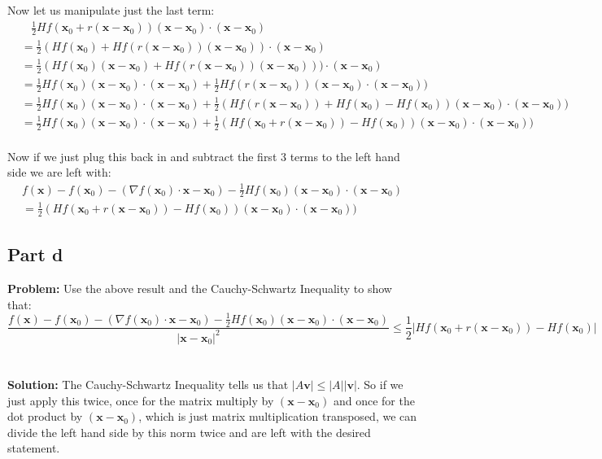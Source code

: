 \documentclass{article}
\begin{document}
Now let us manipulate just the last term:
\begin{align*}
&\ \ \ \ \frac{1}{2}Hf(\mathbf x_0+r(\mathbf x-\mathbf x_0))(\mathbf x-\mathbf x_0)\cdot(\mathbf x-\mathbf x_0)\\
&=\frac{1}{2}(Hf(\mathbf x_0)+Hf(r(\mathbf x-\mathbf x_0))(\mathbf x-\mathbf x_0))\cdot(\mathbf x-\mathbf x_0)\\
&=\frac{1}{2}(Hf(\mathbf x_0)(\mathbf x-\mathbf x_0)+Hf(r(\mathbf x-\mathbf x_0))(\mathbf x-\mathbf x_0)))\cdot(\mathbf x-\mathbf x_0)\\
&=\frac{1}{2}Hf(\mathbf x_0)(\mathbf x-\mathbf x_0)\cdot(\mathbf x-\mathbf x_0)+\frac{1}{2}Hf(r(\mathbf x-\mathbf x_0))(\mathbf x-\mathbf x_0)\cdot(\mathbf x-\mathbf x_0))\\
&=\frac{1}{2}Hf(\mathbf x_0)(\mathbf x-\mathbf x_0)\cdot(\mathbf x-\mathbf x_0)+\frac{1}{2}(Hf(r(\mathbf x-\mathbf x_0))+Hf(\mathbf x_0)-Hf(\mathbf x_0))(\mathbf x-\mathbf x_0)\cdot(\mathbf x-\mathbf x_0))\\
&=\frac{1}{2}Hf(\mathbf x_0)(\mathbf x-\mathbf x_0)\cdot(\mathbf x-\mathbf x_0)+\frac{1}{2}(Hf(\mathbf x_0+r(\mathbf x-\mathbf x_0))-Hf(\mathbf x_0))(\mathbf x-\mathbf x_0)\cdot(\mathbf x-\mathbf x_0))\\
\end{align*}

Now if we just plug this back in and subtract the first 3 terms to the left hand side we are left with:
\begin{align*}f(\mathbf x)-f(\mathbf x_0)-(\nabla f(\mathbf x_0)\cdot\mathbf x-\mathbf x_0)-\frac{1}{2}Hf(\mathbf x_0)(\mathbf x-\mathbf x_0)\cdot(\mathbf x-\mathbf x_0)\\
=\frac{1}{2}(Hf(\mathbf x_0+r(\mathbf x-\mathbf x_0))-Hf(\mathbf x_0))(\mathbf x-\mathbf x_0)\cdot(\mathbf x-\mathbf x_0))
\end{align*}

\subsection*{Part d}
\textbf{Problem:} Use the above result and the Cauchy-Schwartz Inequality to show that:
$$\frac{f(\mathbf x)-f(\mathbf x_0)-(\nabla f(\mathbf x_0)\cdot\mathbf x-\mathbf x_0)-\frac{1}{2}Hf(\mathbf x_0)(\mathbf x-\mathbf x_0)\cdot(\mathbf x-\mathbf x_0)}{|\mathbf x-\mathbf x_0|^2}\le \frac{1}{2}|Hf(\mathbf x_0+r(\mathbf x-\mathbf x_0))-Hf(\mathbf x_0)|$$
\\\\
\textbf{Solution:} The Cauchy-Schwartz Inequality tells us that $|A\mathbf v|\le|A||\mathbf v|$. So if we just apply this twice, once for the matrix multiply by $(\mathbf x-\mathbf x_0)$ and once for the dot product by $(\mathbf x-\mathbf x_0)$, which is just matrix multiplication transposed, we can divide the left hand side by this norm twice and are left with the desired statement.
\end{document}
